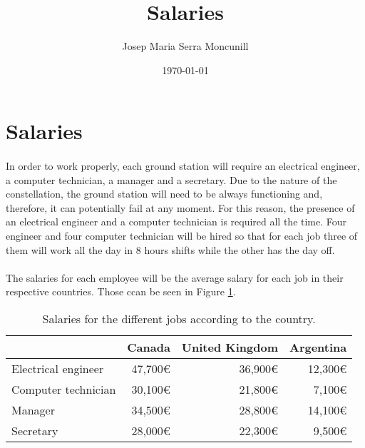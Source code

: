\documentclass[12pt,a4paper]{report}
\author{Josep Maria Serra Moncunill}
\title{Salaries}
\date{\today}
\begin{document}
\maketitle
\tableofcontents
\listoffigures
\listoftables

\newpage

\section{Salaries}

\paragraph{}In order to work properly, each ground station will require an electrical engineer, a computer technician, a manager and a secretary. Due to the nature of the constellation, the ground station will need to be always functioning and, therefore, it can potentially fail at any moment. For this reason, the presence of an electrical engineer and a computer technician is required all the time. Four engineer and four computer technician will be hired so that for each job three of them will work all the day in 8 hours shifts while the other has the day off.

\paragraph{}The salaries for each employee will be the average salary for each job in their respective countries. Those ccan be seen in Figure \ref{table:Salaries}.

\begin{table}[H]
\begin{center}
\begin{tabular}{|l|r|r|r|}
\hline 
 & Canada & United Kingdom & Argentina \\ 
\hline 
Electrical engineer & 47,700\euro & 36,900\euro & 12,300\euro \\ 
\hline 
Computer technician & 30,100\euro & 21,800\euro & 7,100\euro \\ 
\hline 
Manager & 34,500\euro & 28,800\euro & 14,100\euro \\ 
\hline 
Secretary & 28,000\euro & 22,300\euro & 9,500\euro \\ 
\hline 
\end{tabular}
\end{center}
\caption[Salaries according to country]{Salaries for the different jobs according to the country.}
\label{table:Salaries}
\end{table}
\end{document}
